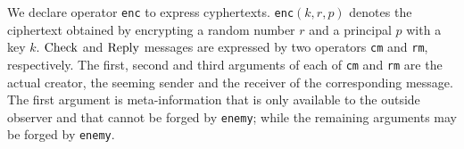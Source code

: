 \documentclass[a4paper,fleqn]{cas-dc}
\begin{document}
We declare operator \verb!enc! to express cyphertexts.
\verb!enc!$(k,r,p)$ denotes the ciphertext obtained by encrypting a random number $r$ and a principal $p$ with a key $k$. 
$\rm Check$ and $\rm Reply$ messages are expressed by two operators \verb!cm! and \verb!rm!, respectively.
The first, second and third arguments of each of \verb!cm! and \verb!rm! are the actual creator, the seeming sender and the receiver of the corresponding message. The first argument is meta-information that is only available to the outside observer and that cannot be forged by \verb!enemy!; while the remaining arguments may be forged by \verb!enemy!. 
	
\end{document}
